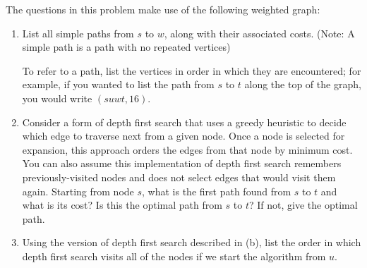\documentclass[9pt]{article}
\begin{document}


\vspace{5mm}

\item The questions in this problem make use of the following weighted graph:

\begin{center}
\end{center}

\begin{enumerate}
    \item List all simple paths from $s$ to $w$, along with their associated costs. (Note: A simple path is a path with no repeated vertices)
    
    To refer to a path, list the vertices in order in which they are encountered; for example, if you wanted to list the path from $s$ to $t$ along the top of the graph, you would write $(suwt, 16)$.
    
    \item Consider a form of depth first search that uses a greedy heuristic to decide which edge to traverse next from a given node. Once a node is selected for expansion, this approach orders the edges from that node by minimum cost. You can also assume this implementation of depth first search remembers previously-visited nodes and does not select edges that would visit them again. Starting from node $s$, what is the first path found from $s$ to $t$ and what is its cost? Is this the optimal path from $s$ to $t$? If not, give the optimal path.
    
    \item Using the version of depth first search described in (b), list the order in which depth first search visits all of the nodes if we start the algorithm from $u$.
    
\end{enumerate}
\end{document}
